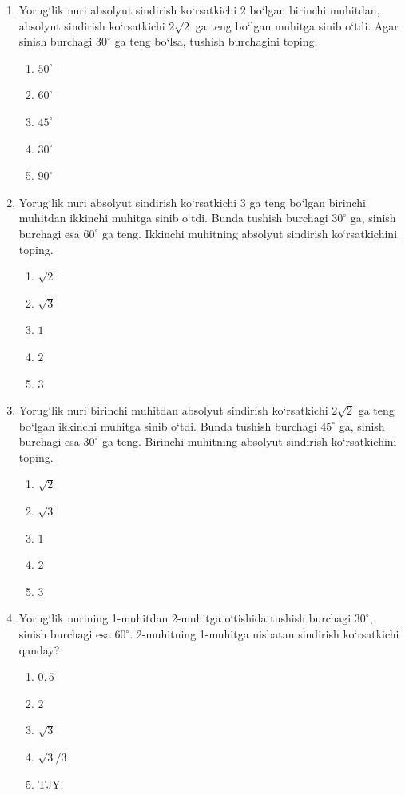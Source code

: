 \begin{enumerate}
\item Yorug‘lik nuri absolyut sindirish ko‘rsatkichi $2$ bo‘lgan birinchi muhitdan, absolyut sindirish ko‘rsatkichi $2\sqrt{2}$ ga teng bo‘lgan muhitga sinib o‘tdi. Agar sinish burchagi $30^\circ$ ga teng bo‘lsa, tushish burchagini toping.
\begin{enumerate}[label=\Alph*)]
\item $50^\circ$
\item $60^\circ$
\item $45^\circ$
\item $30^\circ$
\item $90^\circ$
\end{enumerate}

\item Yorug‘lik nuri absolyut sindirish ko‘rsatkichi $3$ ga teng bo‘lgan birinchi muhitdan ikkinchi muhitga sinib o‘tdi. Bunda tushish burchagi $30^\circ$ ga, sinish burchagi esa $60^\circ$ ga teng. Ikkinchi muhitning absolyut sindirish ko‘rsatkichini toping.
\begin{enumerate}[label=\Alph*)]
\item $\sqrt{2}$
\item $\sqrt{3}$
\item $1$
\item $2$
\item $3$
\end{enumerate}

\item Yorug‘lik nuri birinchi muhitdan absolyut sindirish ko‘rsatkichi $2\sqrt{2}$ ga teng bo‘lgan ikkinchi muhitga sinib o‘tdi. Bunda tushish burchagi $45^\circ$ ga, sinish burchagi esa $30^\circ$ ga teng. Birinchi muhitning absolyut sindirish ko‘rsatkichini toping.
\begin{enumerate}[label=\Alph*)]
\item $\sqrt{2}$
\item $\sqrt{3}$
\item $1$
\item $2$
\item $3$
\end{enumerate}

\item Yorug‘lik nurining 1-muhitdan 2-muhitga o‘tishida tushish burchagi $30^\circ$, sinish burchagi esa $60^\circ$. 2-muhitning 1-muhitga nisbatan sindirish ko‘rsatkichi qanday?
\begin{enumerate}[label=\Alph*)]
\item $0,5$
\item $2$
\item $\sqrt{3}$
\item $\sqrt{3}/3$
\item TJY.
\end{enumerate}


\end{enumerate}
